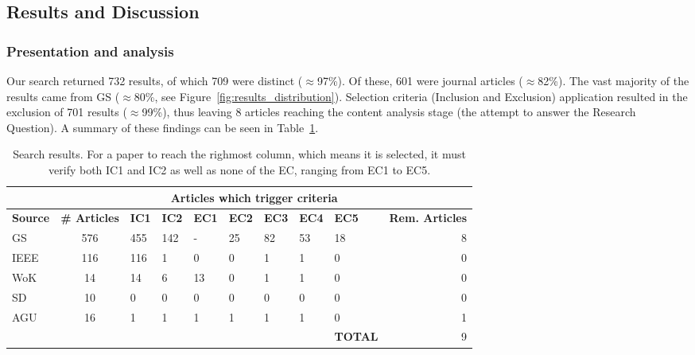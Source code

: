 \subsection{Results and Discussion}
\label{sub:results_and_discussion}

\subsubsection{Presentation and analysis}
\label{ssub:result_presentation}

Our search returned 732 results, of which 709 were distinct
($\approx$97\%). Of these, 601 were journal articles ($\approx$82\%).
The vast majority of the results came from GS ($\approx$80\%, see
Figure~\ref{fig:results_distribution}).  Selection criteria (Inclusion
and Exclusion) application resulted in the exclusion of 701 results
($\approx$99\%), thus leaving 8 articles reaching the content analysis
stage (the attempt to answer the Research Question). A summary of these
findings can be seen in Table~\ref{tab:search_results}.

 \begin{table}[htb]
    \centering
    \caption{Search results. For a paper to reach the righmost column,
    which means it is selected, it must verify both IC1 and IC2 as well
    as none of the EC, ranging from EC1 to EC5.}
    \label{tab:search_results}
    \begin{small}
        \begin{tabularx}{\textwidth}{lcXXXXXXXr}%
            \toprule
             &  & \multicolumn{7}{c}{\textbf{Articles which trigger criteria}} &  \\ \midrule
            \textbf{Source} & \textbf{\# Articles} & \textbf{IC1} & \textbf{IC2} &
            \textbf{EC1} & \textbf{EC2} & \textbf{EC3} & \textbf{EC4} &
            \textbf{EC5} & \textbf{Rem. Articles} \\ \midrule
            GS & 576 & 455 & 142 & - & 25 & 82 & 53 & 18 & 8 \\
            IEEE & 116 & 116 & 1 & 0 & 0 & 1 & 1 & 0 & 0 \\
            WoK & 14 & 14 & 6 & 13 & 0 & 1 & 1 & 0 & 0 \\
            SD & 10 & 0 & 0 & 0 & 0 & 0 & 0 & 0 & 0 \\
            AGU & 16 & 1 & 1 & 1 & 1 & 1 & 1 & 0 & 1 \\ \midrule
                &  &  &  &  &  &  &  & \textbf{TOTAL} & 9 \\ \cmidrule(l){9-10}
        \end{tabularx}    
    \end{small}
\end{table}


